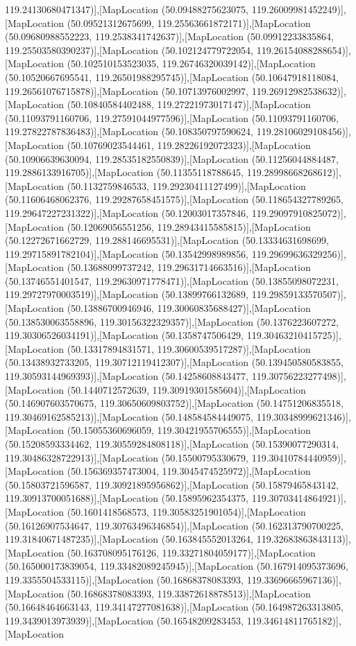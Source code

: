 119.24130680471347)],[MapLocation (50.09488275623075, 119.26009981452249)],[MapLocation (50.09521312675699, 119.25563661872171)],[MapLocation (50.09680988552223, 119.2538341742637)],[MapLocation (50.09912233835864, 119.25503580390237)],[MapLocation (50.102124779722054, 119.26154088288654)],[MapLocation (50.102510153523035, 119.26746320039142)],[MapLocation (50.10520667695541, 119.26501988295745)],[MapLocation (50.10647918118084, 119.26561076715878)],[MapLocation (50.10713976002997, 119.26912982538632)],[MapLocation (50.10840584402488, 119.27221973017147)],[MapLocation (50.11093791160706, 119.27591044977596)],[MapLocation (50.11093791160706, 119.27822787836483)],[MapLocation (50.108350797590624, 119.28106029108456)],[MapLocation (50.10769023544461, 119.28226192072323)],[MapLocation (50.10906639630094, 119.28535182550839)],[MapLocation (50.11256044884487, 119.2886133916705)],[MapLocation (50.11355118788645, 119.28998668268612)],[MapLocation (50.1132759846533, 119.29230411127499)],[MapLocation (50.11606468062376, 119.29287658451575)],[MapLocation (50.118654327789265, 119.29647227231322)],[MapLocation (50.12003017357846, 119.29097910825072)],[MapLocation (50.12069056551256, 119.28943415585815)],[MapLocation (50.12272671662729, 119.288146695531)],[MapLocation (50.13334631698699, 119.29715891782104)],[MapLocation (50.13542998989856, 119.29699636329256)],[MapLocation (50.13688099737242, 119.29631714663516)],[MapLocation (50.13746551401547, 119.29630971778471)],[MapLocation (50.13855098072231, 119.29727970003519)],[MapLocation (50.13899766132689, 119.29859133570507)],[MapLocation (50.13886700946946, 119.30060835688427)],[MapLocation (50.138530063558896, 119.30156322329357)],[MapLocation (50.1376223607272, 119.30306526034191)],[MapLocation (50.1358747506429, 119.30463210415725)],[MapLocation (50.13317894831571, 119.30600539517287)],[MapLocation (50.13438932733205, 119.30712119412307)],[MapLocation (50.139450580583855, 119.30593144969393)],[MapLocation (50.14258608843477, 119.30756223277498)],[MapLocation (50.1440712572639, 119.30919301585604)],[MapLocation (50.146907603570675, 119.30650609803752)],[MapLocation (50.14751206835518, 119.30469162585213)],[MapLocation (50.148584584449075, 119.30348999621346)],[MapLocation (50.15055360696059, 119.30421955706555)],[MapLocation (50.15208593334462, 119.30559284808118)],[MapLocation (50.15390077290314, 119.30486328722913)],[MapLocation (50.15500795330679, 119.30410784440959)],[MapLocation (50.156369357473004, 119.3045474525972)],[MapLocation (50.15803721596587, 119.30921895956862)],[MapLocation (50.15879465843142, 119.30913700051688)],[MapLocation (50.15895962354375, 119.30703414864921)],[MapLocation (50.1601418568573, 119.30583251901054)],[MapLocation (50.16126907534647, 119.30763496346854)],[MapLocation (50.162313790700225, 119.31840671487235)],[MapLocation (50.163845552013264, 119.32683863843113)],[MapLocation (50.163708095176126, 119.33271804059177)],[MapLocation (50.165000173839054, 119.33482089245945)],[MapLocation (50.167914095373696, 119.3355504533115)],[MapLocation (50.16868378083393, 119.33696665967136)],[MapLocation (50.16868378083393, 119.33872618878513)],[MapLocation (50.16648464663143, 119.34147277081638)],[MapLocation (50.164987263313805, 119.3439013973939)],[MapLocation (50.16548209283453, 119.34614811765182)],[MapLocation 